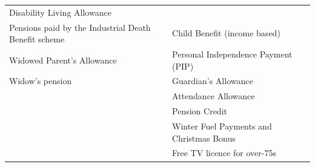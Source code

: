 \documentclass[]{tufte-handout}
\begin{document}
\begin{longtable}[]{@{}ll@{}}
\begin{minipage}[t]{0.50\columnwidth}
Disability Living Allowance\strut
\end{minipage}\tabularnewline
\begin{minipage}[t]{0.45\columnwidth}\raggedright
Pensions paid by the Industrial Death Benefit scheme\strut
\end{minipage} & \begin{minipage}[t]{0.50\columnwidth}\raggedright
Child Benefit (income based)\strut
\end{minipage}\tabularnewline
\begin{minipage}[t]{0.45\columnwidth}\raggedright
Widowed Parent's Allowance\strut
\end{minipage} & \begin{minipage}[t]{0.50\columnwidth}\raggedright
Personal Independence Payment (PIP)\strut
\end{minipage}\tabularnewline
\begin{minipage}[t]{0.45\columnwidth}\raggedright
Widow's pension\strut
\end{minipage} & \begin{minipage}[t]{0.50\columnwidth}\raggedright
Guardian's Allowance\strut
\end{minipage}\tabularnewline
\begin{minipage}[t]{0.45\columnwidth}\raggedright
\strut
\end{minipage} & \begin{minipage}[t]{0.50\columnwidth}\raggedright
Attendance Allowance\strut
\end{minipage}\tabularnewline
\begin{minipage}[t]{0.45\columnwidth}\raggedright
\strut
\end{minipage} & \begin{minipage}[t]{0.50\columnwidth}\raggedright
Pension Credit\strut
\end{minipage}\tabularnewline
\begin{minipage}[t]{0.45\columnwidth}\raggedright
\strut
\end{minipage} & \begin{minipage}[t]{0.50\columnwidth}\raggedright
Winter Fuel Payments and Christmas Bonus\strut
\end{minipage}\tabularnewline
\begin{minipage}[t]{0.45\columnwidth}\raggedright
\strut
\end{minipage} & \begin{minipage}[t]{0.50\columnwidth}\raggedright
Free TV licence for over-75s\strut
\end{minipage}\tabularnewline

\end{longtable}
\end{document}
